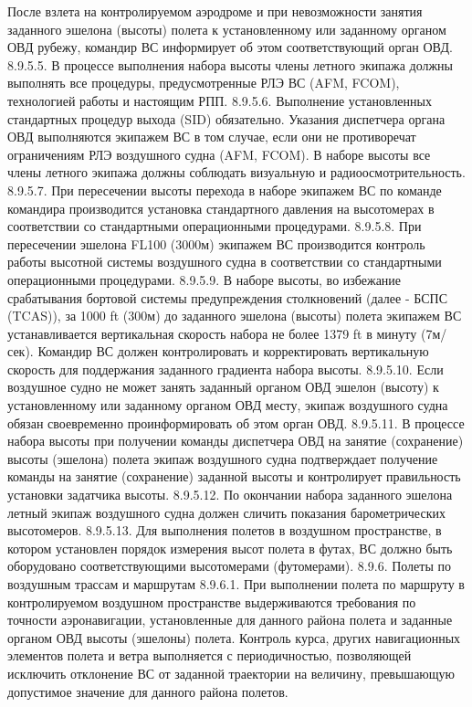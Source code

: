 После взлета на контролируемом аэродроме и при невозможности занятия заданного эшелона (высоты) полета к установленному или заданному органом ОВД рубежу, командир ВС информирует об этом соответствующий орган ОВД.
8.9.5.5. В процессе выполнения набора высоты члены летного экипажа должны выполнять все процедуры, предусмотренные РЛЭ ВС (AFM, FCOM), технологией работы и настоящим РПП. 
8.9.5.6. Выполнение установленных стандартных процедур выхода (SID) обязательно. Указания диспетчера органа ОВД выполняются экипажем ВС в том случае, если они не противоречат ограничениям РЛЭ воздушного судна (AFM, FCOM). 
В наборе высоты все члены летного экипажа должны соблюдать визуальную и радиоосмотрительность. 
8.9.5.7. При пересечении высоты перехода в наборе экипажем ВС по команде командира производится установка стандартного давления на высотомерах в соответствии со стандартными операционными процедурами. 
8.9.5.8. При пересечении эшелона FL100 (3000м) экипажем ВС производится контроль работы высотной системы воздушного судна в соответствии со стандартными операционными процедурами. 
8.9.5.9. В наборе высоты, во избежание срабатывания бортовой системы предупреждения столкновений (далее - БСПС (TCAS)), за 1000 ft (300м) до заданного эшелона (высоты) полета экипажем ВС устанавливается вертикальная скорость набора не более 1379 ft в минуту (7м/сек). 
Командир ВС должен контролировать и корректировать вертикальную скорость для поддержания заданного градиента набора высоты.
8.9.5.10. Если воздушное судно не может занять заданный органом ОВД эшелон (высоту) к установленному или заданному органом ОВД месту, экипаж воздушного судна обязан своевременно проинформировать об этом орган ОВД. 
8.9.5.11. В процессе набора высоты при получении команды диспетчера ОВД на занятие (сохранение) высоты (эшелона) полета экипаж воздушного судна подтверждает получение команды на занятие (сохранение) заданной высоты и контролирует правильность установки задатчика высоты.
8.9.5.12. По окончании набора заданного эшелона летный экипаж воздушного судна должен сличить показания барометрических высотомеров.
8.9.5.13. Для выполнения полетов в воздушном пространстве, в котором установлен порядок измерения высот полета в футах, ВС должно быть оборудовано соответствующими высотомерами (футомерами).
8.9.6.	Полеты по воздушным трассам и маршрутам
8.9.6.1. При выполнении полета по маршруту в контролируемом воздушном пространстве выдерживаются требования по точности аэронавигации, установленные для данного района полета и заданные органом ОВД высоты (эшелоны) полета.
Контроль курса, других навигационных элементов полета и ветра выполняется с периодичностью, позволяющей исключить отклонение ВС от заданной траектории на величину, превышающую допустимое значение для данного района полетов. 
